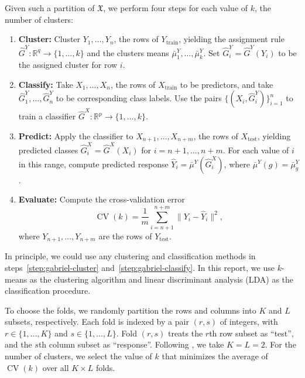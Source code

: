 \documentclass[11pt]{article}
\newcommand{\CV}{\operatorname{CV}}
\newcommand{\dataX}{\mathfrak{X}}
\newcommand{\Xtrain}{X_{\text{train}}}
\newcommand{\Ytrain}{Y_{\text{train}}}
\newcommand{\Xtest}{X_{\text{test}}}
\newcommand{\Ytest}{Y_{\text{test}}}
\newcommand{\hGX}{\hat G^{X}}
\newcommand{\hGY}{\hat G^{Y}}
\newcommand{\bmuY}{\bar \mu^{Y}}
\begin{document}
Given such a partition of $\dataX$, we perform four steps for each value of
$k$, the number of clusters:
\begin{enumerate}
  \item \label{step:gabriel-cluster}
    \textbf{Cluster:}
    Cluster $Y_{1}, \dotsc, Y_n$, the rows of $\Ytrain$, yielding the
    assignment rule $\hGY : \mathbb{R}^q \to \{ 1, \dotsc, k \}$ and the
    clusters means $\bmuY_1, \dotsc, \bmuY_k$.  Set $\hGY_i = \hGY(Y_i)$ to
    be the assigned cluster for row $i$.

  \item \label{step:gabriel-classify}
    \textbf{Classify:}
    Take $X_{1}, \dotsc, X_n$, the rows of $\Xtrain$ to be predictors,
    and take $\hGY_1, \dotsc, \hGY_n$ to be corresponding class labels.  Use
    the pairs $\{ (X_i, \hGY_i) \}_{i=1}^{n}$ to train a classifier
    $\hGX : \mathbb{R}^p \to \{ 1, \dotsc, k \}$.

  \item \label{step:gabriel-predict}
    \textbf{Predict:}
    Apply the classifier to $X_{n+1}, \dotsc, X_{n+m}$, the rows of
    $\Xtest$, yielding predicted classes $\hGX_i = \hGX(X_i)$ for
    $i = n+1, \dotsc, n+m$.  For each value of $i$ in this range, compute
    predicted response $\hat Y_i = \bmuY(\hGX_i)$, where
    $\bmuY(g) = \bmuY_g$.

  \item \label{step:gabriel-evaluate}
    \textbf{Evaluate:}
    Compute the cross-validation error
    \[
      \CV(k) = \frac{1}{m} \sum_{i=n+1}^{n+m} \|Y_i - \hat Y_i\|^2,
    \]
    where $Y_{n+1}, \dotsc, Y_{n+m}$ are the rows of $\Ytest$.
\end{enumerate}
\noindent
In principle, we could use any clustering and classification methods in
steps~\ref{step:gabriel-cluster} and~\ref{step:gabriel-classify}.  In this
report, we use $k$-means as the clustering algorithm and linear discriminant
analysis (LDA) as the classification procedure.


To choose the folds, we randomly partition the rows and columns into $K$ and
$L$ subsets, respectively.  Each fold is indexed by a pair $(r,s)$ of
integers, with $r \in \{1, \dotsc, K\}$ and $s \in \{1, \dotsc, L\}$.  Fold
$(r,s)$ treats the $r$th row subset as ``test'', and the $s$th column subset
as ``response''.  Following \citet{owen2009bi}, we take $K = L = 2$.  For the
number of clusters, we select the value of $k$ that minimizes the average of
$\CV(k)$ over all $K \times L$ folds.
\end{document}
